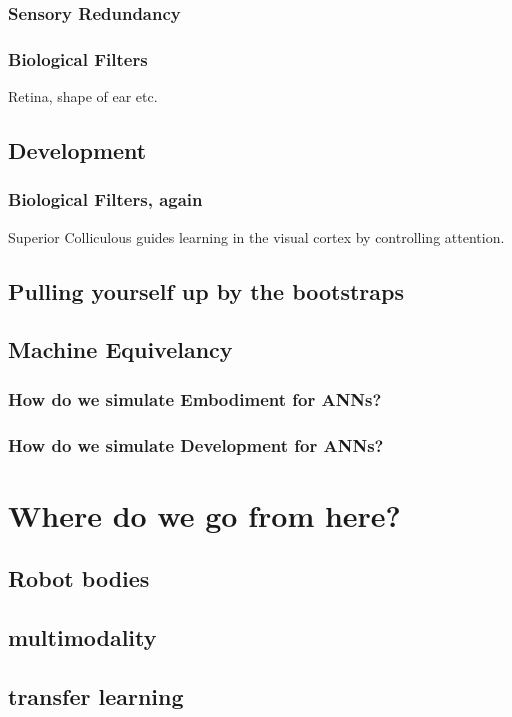 \subsubsection{Sensory Redundancy}
\subsubsection{Biological Filters}
Retina, shape of ear etc.
\subsection{Development}
\subsubsection{Biological Filters, again}
Superior Colliculous guides learning in the visual cortex by controlling attention.
\subsection{Pulling yourself up by the bootstraps}

\subsection{Machine Equivelancy}
\subsubsection{How do we simulate Embodiment for ANNs?}
\subsubsection{How do we simulate Development for ANNs?}

\section{Where do we go from here?}
\subsection{Robot bodies}
\subsection{multimodality}
\subsection{transfer learning}


